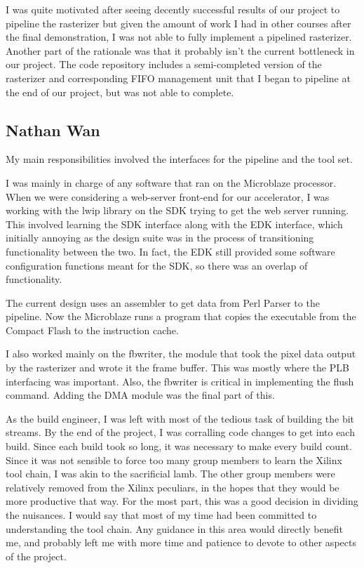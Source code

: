 \documentclass[letterpaper,10pt]{article}
\begin{document}
I was quite motivated after seeing decently successful results of our project to pipeline the rasterizer but given the amount of work I had in other courses after the final demonstration, I was not able to fully implement a pipelined rasterizer. Another part of the rationale was that it probably isn't the current bottleneck in our project. The code repository includes a semi-completed version of the rasterizer and corresponding FIFO management unit that I began to pipeline at the end of our project, but was not able to complete.

\subsection{Nathan Wan}

My main responsibilities involved the interfaces for the pipeline and the tool set.

I was mainly in charge of any software that ran on the Microblaze processor.  When we were considering a web-server front-end for our accelerator, I was working with the lwip library on the SDK trying to get the web server running.  This involved learning the SDK interface along with the EDK interface, which initially annoying as the design suite was in the process of transitioning functionality between the two.  In fact, the EDK still provided some software configuration functions meant for the SDK, so there was an overlap of functionality.

The current design uses an assembler to get data from Perl Parser to the pipeline.  Now the Microblaze runs a program that copies the executable from the Compact Flash to the instruction cache.

I also worked mainly on the fbwriter, the module that took the pixel data output by the rasterizer and wrote it the frame buffer.  This was mostly where the PLB interfacing was important.  Also, the fbwriter is critical in implementing the flush command.  Adding the DMA module was the final part of this.

As the build engineer, I was left with most of the tedious task of building the bit streams.  By the end of the project, I was corralling code changes to get into each build.  Since each build took so long, it was necessary to make every build count.  Since it was not sensible to force too many group members to learn the Xilinx tool chain, I was akin to the sacrificial lamb.  The other group members were relatively removed from the Xilinx peculiars, in the hopes that they would be more productive that way.  For the most part, this was a good decision in dividing the nuisances.  I would say that most of my time had been committed to understanding the tool chain.  Any guidance in this area would directly benefit me, and probably left me with more time and patience to devote to other aspects of the project.
\end{document}

